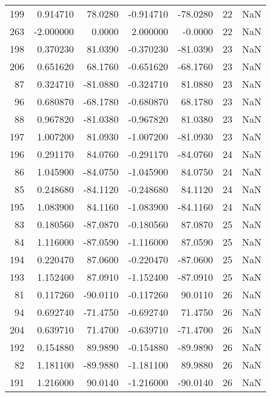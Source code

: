 \begin{tabular}{rrrrrrr}
199 &    0.914710 &   78.0280 &   -0.914710 &    -78.0280 &          22 & NaN \\
263 &   -2.000000 &    0.0000 &    2.000000 &     -0.0000 &          22 & NaN \\
198 &    0.370230 &   81.0390 &   -0.370230 &    -81.0390 &          23 & NaN \\
206 &    0.651620 &   68.1760 &   -0.651620 &    -68.1760 &          23 & NaN \\
 87 &    0.324710 &  -81.0880 &   -0.324710 &     81.0880 &          23 & NaN \\
 96 &    0.680870 &  -68.1780 &   -0.680870 &     68.1780 &          23 & NaN \\
 88 &    0.967820 &  -81.0380 &   -0.967820 &     81.0380 &          23 & NaN \\
197 &    1.007200 &   81.0930 &   -1.007200 &    -81.0930 &          23 & NaN \\
196 &    0.291170 &   84.0760 &   -0.291170 &    -84.0760 &          24 & NaN \\
 86 &    1.045900 &  -84.0750 &   -1.045900 &     84.0750 &          24 & NaN \\
 85 &    0.248680 &  -84.1120 &   -0.248680 &     84.1120 &          24 & NaN \\
195 &    1.083900 &   84.1160 &   -1.083900 &    -84.1160 &          24 & NaN \\
 83 &    0.180560 &  -87.0870 &   -0.180560 &     87.0870 &          25 & NaN \\
 84 &    1.116000 &  -87.0590 &   -1.116000 &     87.0590 &          25 & NaN \\
194 &    0.220470 &   87.0600 &   -0.220470 &    -87.0600 &          25 & NaN \\
193 &    1.152400 &   87.0910 &   -1.152400 &    -87.0910 &          25 & NaN \\
 81 &    0.117260 &  -90.0110 &   -0.117260 &     90.0110 &          26 & NaN \\
 94 &    0.692740 &  -71.4750 &   -0.692740 &     71.4750 &          26 & NaN \\
204 &    0.639710 &   71.4700 &   -0.639710 &    -71.4700 &          26 & NaN \\
192 &    0.154880 &   89.9890 &   -0.154880 &    -89.9890 &          26 & NaN \\
 82 &    1.181100 &  -89.9880 &   -1.181100 &     89.9880 &          26 & NaN \\
191 &    1.216000 &   90.0140 &   -1.216000 &    -90.0140 &          26 & NaN \\

\end{tabular}
